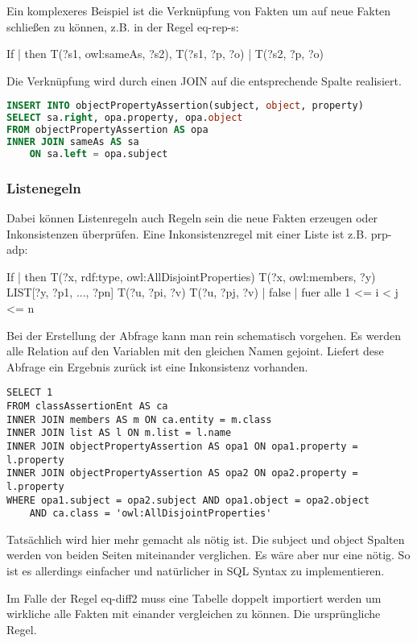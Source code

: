 Ein komplexeres Beispiel ist die Verknüpfung von Fakten um auf neue Fakten schließen zu können, z.B. in der Regel eq-rep-s:

If | then
T(?s1, owl:sameAs, ?s2), T(?s1, ?p, ?o) | T(?s2, ?p, ?o)

Die Verknüpfung wird durch einen JOIN auf die entsprechende Spalte realisiert.

\begin{lstlisting}[language=SQL]
INSERT INTO objectPropertyAssertion(subject, object, property)
SELECT sa.right, opa.property, opa.object
FROM objectPropertyAssertion AS opa
INNER JOIN sameAs AS sa
	ON sa.left = opa.subject
\end{lstlisting}

\subsubsection{Listenegeln}
Dabei können Listenregeln auch Regeln sein die neue Fakten erzeugen oder Inkonsistenzen überprüfen. Eine Inkonsistenzregel mit einer Liste ist z.B. prp-adp:

If | then
T(?x, rdf:type, owl:AllDisjointProperties)
T(?x, owl:members, ?y)
LIST[?y, ?p1, ..., ?pn]
T(?u, ?pi, ?v)
T(?u, ?pj, ?v)                                    | false | fuer alle 1 <= i < j <= n 

Bei der Erstellung der Abfrage kann man rein schematisch vorgehen. Es werden alle Relation auf den Variablen mit den gleichen Namen gejoint. Liefert dese Abfrage ein Ergebnis zurück ist eine Inkonsistenz vorhanden.

\begin{lstlisting}
SELECT 1
FROM classAssertionEnt AS ca
INNER JOIN members AS m ON ca.entity = m.class
INNER JOIN list AS l ON m.list = l.name
INNER JOIN objectPropertyAssertion AS opa1 ON opa1.property = l.property
INNER JOIN objectPropertyAssertion AS opa2 ON opa2.property = l.property
WHERE opa1.subject = opa2.subject AND opa1.object = opa2.object
	AND ca.class = 'owl:AllDisjointProperties'
\end{lstlisting}

Tatsächlich wird hier mehr gemacht als nötig ist. Die subject und object Spalten werden von beiden Seiten miteinander verglichen. Es wäre aber nur eine nötig. So ist es allerdings einfacher und natürlicher in SQL Syntax zu implementieren.

Im Falle der Regel eq-diff2 muss eine Tabelle doppelt importiert werden um wirkliche alle Fakten mit einander vergleichen zu können. Die ursprüngliche Regel.


